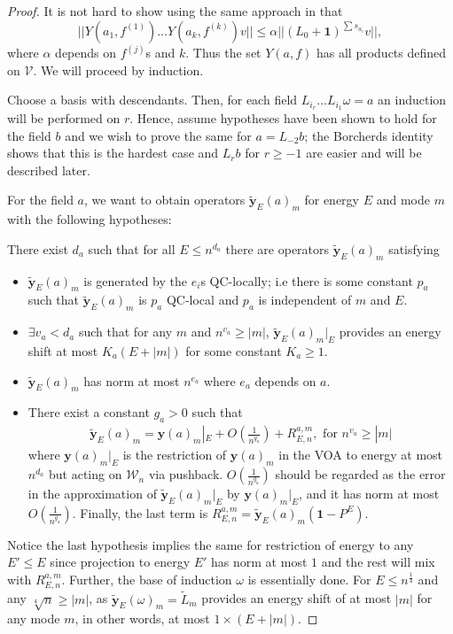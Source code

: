\documentclass[twoside,11pt,titlepage]{amsart}
\renewcommand{\=}[1]{\stackrel{#1}{=}} %
\theoremstyle{definition}
\theoremstyle{remark}
\begin{document}
\begin{proof} It is not hard to show using the same approach in \cite[Lemma 3.2.1]{weiner2007conformal} that
$$||Y(a_1,f^{(1)})\ldots Y(a_k,f^{(k)})v|| \le \alpha||(L_0+\textbf{1})^{\sum s_{a_i}}v||,$$
where $\alpha$ depends on $f^{(j)}$s and $k$. Thus the set $Y(a,f)$ has all products defined on $\mathcal{V}$.
We will proceed by induction. 

Choose a basis with descendants. Then, for each field $L_{i_r}\ldots L_{i_1}\omega=a$ an induction will be performed on $r$. Hence, assume hypotheses have been shown to hold for the field $b$ and we wish to prove the same for $a=L_{-2}b$; the Borcherds identity shows that this is the hardest case and $L_rb$ for $r\ge -1$ are easier and will be described later.

For the field $a$, we want to obtain operators $\widetilde{\textbf{y}}_E(a)_m$ for energy $E$ and mode $m$ with the following hypotheses:

There exist $d_a$ such that for all $E \le n^{d_a}$ there are operators $\widetilde{\textbf{y}}_E(a)_m$ satisfying
\begin{itemize}
    \item $\widetilde{\textbf{y}}_E(a)_m$ is generated by the $e_i$s QC-locally; i.e there is some constant $p_a$ such that $\widetilde{\textbf{y}}_E(a)_m$ is $p_a$ QC-local and $p_a$ is independent of $m$ and $E$.
    \item $\exists v_a<d_a$ such that for any $m$ and $n^{v_a} \ge |m|$, $\widetilde{\textbf{y}}_E(a)_m|_E$ provides an energy shift at most $K_a(E+|m|)$ for some constant $K_a \ge 1$.
    \item $\widetilde{\textbf{y}}_E(a)_m$ has norm at most $n^{e_a}$ where $e_a$ depends on $a$.
    \item There exist a constant $g_a>0$ such that 
    \begin{align}\label{eq11}
    \widetilde{\textbf{y}}_E(a)_m=\textbf{y}(a)_m|_{E}+O(\frac{1}{n^{g_a}})+R_{E,n}^{a,m},\text{ for }n^{v_a} \ge |m|
    \end{align}
        where $\textbf{y}(a)_m|_{E}$ is the restriction of $\textbf{y}(a)_m$ in the VOA to energy at most $n^{d_a}$ but acting on $\mathcal{W}_n$ via pushback. $O(\frac{1}{n^{g_a}})$ should be regarded as the error in the approximation of $\widetilde{\textbf{y}}_E(a)_m|_{E}$ by ${\textbf{y}}(a)_m|_{E}$, and it has norm at most $O(\frac{1}{n^{g_a}})$. Finally, the last term is $R_{E,n}^{a,m}=\widetilde{\textbf{y}}_E(a)_m(\textbf{1}-P^E)$.
\end{itemize}
Notice the last hypothesis implies the same for restriction of energy to any $E' \le E$ since projection to energy $E'$ has norm at most $1$ and the rest will mix with $R_{E,n}^{a,m}$. Further, the base of induction $\omega$ is essentially done. For $E \le n^\frac{1}{4}$ and any $\sqrt[4]{n} \ge |m|$, as $\widetilde{\textbf{y}}_E(\omega)_m=\widetilde{L}_m$ provides an energy shift of at most $|m|$ for any mode $m$, in other words, at most $1 \times (E+|m|)$.


\end{proof}
\end{document}
